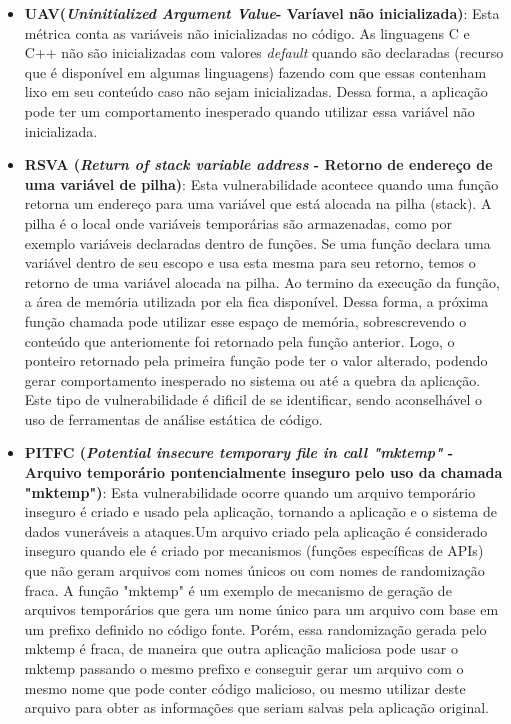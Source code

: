 \begin{itemize}

\item \textbf{UAV(\emph{Uninitialized Argument Value}- Varíavel não inicializada)}:
%
Esta métrica conta as variáveis não inicializadas no código. As linguagens C e C++ não são inicializadas com valores \emph{default} quando são declaradas (recurso que é disponível em algumas linguagens) fazendo com que essas contenham lixo em seu conteúdo caso não sejam inicializadas. Dessa forma, a aplicação pode ter um comportamento inesperado quando utilizar essa variável não inicializada.

\item \textbf{ RSVA (\emph{Return of stack variable address} - Retorno de endereço de uma variável de pilha)}:
%
Esta vulnerabilidade acontece quando uma função retorna um endereço para uma variável que está alocada na pilha (stack). A pilha é o local onde variáveis temporárias são armazenadas, como por exemplo variáveis declaradas dentro de funções. Se uma função declara uma variável dentro de seu escopo e usa esta mesma para seu retorno, temos o retorno de uma variável alocada na pilha. Ao termino da execução da função, a área de memória utilizada por ela fica disponível. Dessa forma, a próxima função chamada pode utilizar esse espaço de memória, sobrescrevendo o conteúdo que anteriomente foi retornado pela função anterior. Logo, o ponteiro retornado pela primeira função pode ter o valor alterado, podendo gerar comportamento inesperado no sistema ou até a quebra da aplicação. Este tipo de vulnerabilidade é dificil de se identificar, sendo aconselhável o uso de ferramentas de análise estática de código.

\item \textbf{PITFC (\emph{Potential insecure temporary file in call "mktemp" } - Arquivo temporário pontencialmente inseguro pelo uso da chamada "mktemp")}:
%
Esta vulnerabilidade ocorre quando um arquivo temporário inseguro é criado e usado pela aplicação, tornando a aplicação e o sistema de dados vuneráveis a ataques.Um arquivo criado pela aplicação é considerado inseguro quando ele é criado por mecanismos (funções específicas de APIs) que não geram arquivos com nomes únicos ou com nomes de randomização fraca. A função "mktemp" é um exemplo de mecanismo de geração de arquivos temporários que gera um nome único para um arquivo com base em um prefixo definido no código fonte. Porém, essa randomização gerada pelo mktemp é fraca, de maneira que outra aplicação maliciosa pode usar o mktemp passando o mesmo prefixo e conseguir gerar um arquivo com o mesmo nome que pode conter código malicioso, ou mesmo utilizar deste arquivo para obter as informações que seriam salvas pela aplicação original.


\end{itemize}
